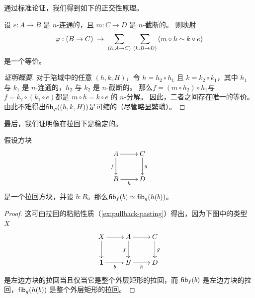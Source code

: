 %

通过标准论证，我们得到如下的正交性原理。

\begin{thm}
  设 $e:A\to B$ 是 $n$-连通的，且 $m:C\to D$ 是 $n$-截断的。
  则映射
  \[ \varphi: (B\to C) \;\to\; \sm{h:A\to C}{k:B\to D} (m\circ h \htpy k \circ e) \]
  是一个等价。
\end{thm}

\begin{proof}[证明概要]
  对于陪域中的任意 $(h,k,H)$，令 $h = h_2 \circ h_1$ 且 $k = k_2 \circ k_1$，其中 $h_1$ 与 $k_1$ 是 $n$-连通的，$h_2$ 与 $k_2$ 是 $n$-截断的。
  那么$f = (m\circ h_2) \circ h_1$与$f = k_2 \circ (k_1\circ e)$都是 $m \circ h = k\circ e$ 的 $n$-分解。
  因此，二者之间存在唯一的等价。
  由此不难得出${\mathsf{fib}}_{\varphi}((h,k,H))$是可缩的（尽管略显繁琐）。
\end{proof}

%
%

最后，我们证明像在拉回下是稳定的。

\begin{lem}\label{lem:hfiber_wrt_pullback}
假设方块
\begin{equation*}
  \vcenter{\xymatrix{
      A\ar[r]\ar[d]_f &
      C\ar[d]^g\\
      B\ar[r]_-h &
      D
      }}
\end{equation*}
是一个拉回方块，并设 $b:B$。那么${\mathsf{fib}}_{f}(b)\simeq{\mathsf{fib}}_{g}(h(b))$。
\end{lem}

\begin{proof}
这可由拉回的粘贴性质（\cref{ex:pullback-pasting}）得出，因为下图中的类型 $X$
\begin{equation*}
  \vcenter{\xymatrix{
      X\ar[r]\ar[d] &
      A\ar[r]\ar[d]_f &
      C\ar[d]^g\\
      \unit\ar[r]_b &
      B\ar[r]_h &
      D
      }}
\end{equation*}
是左边方块的拉回当且仅当它是整个外层矩形的拉回，而 ${\mathsf{fib}}_{f}(b)$ 是左边方块的拉回，${\mathsf{fib}}_{g}(h(b))$ 是整个外层矩形的拉回。
\end{proof}


